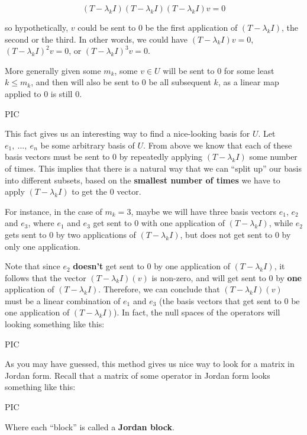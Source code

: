 \documentclass[10pt, oneside]{article}
\begin{document}
   $$(T - \lambda_k I) (T - \lambda_k I) (T - \lambda_k I) v = 0$$

   so hypothetically, $v$ could be sent to $0$ be the first application of $(T - \lambda_k I)$, the second or the third. In other words,
   we could have $(T - \lambda_k I) v = 0$, $(T - \lambda_k I)^2 v = 0$, or $(T - \lambda_k I)^3 v = 0$.
   \newline

   More generally given some $m_k$, some
   $v \in U$ will be sent to $0$ for some least $k \leq m_k$, and then will also be sent to $0$ be all subsequent $k$, as a linear map applied to $0$ is still $0$.
   \newline

   PIC
   \newline

   This fact gives us an interesting way to find a nice-looking basis for $U$. Let $e_1, \ ..., \ e_n$ be some arbitrary basis of $U$. From above we know that each of
   these basis vectors must be sent to $0$ by repeatedly applying $(T - \lambda_k I)$ some number of times. This implies that there is a natural way that we can
   ``split up'' our basis into different subsets, based
   on the \textbf{smallest number of times} we have to apply $(T - \lambda_k I)$ to get the $0$ vector.
   \newline

   For instance, in the case of $m_k = 3$, maybe we will have three basis vectors $e_1$, $e_2$ and $e_3$, where $e_1$ and $e_3$ get sent to $0$ with one application of $(T - \lambda_k I)$, while
   $e_2$ gets sent to $0$ by two applications of $(T - \lambda_k I)$, but does not get sent to $0$ by only one application.
   \newline

   Note that since $e_2$ \textbf{doesn't} get sent to $0$ by
   one application of $(T - \lambda_k I)$, it follows that the vector $(T - \lambda_k I)(v)$ is non-zero, and will get sent to $0$ by \textbf{one} application of $(T - \lambda_k I)$. Therefore,
   we can conclude that $(T - \lambda_k I)(v)$ must be a linear combination of $e_1$ and $e_3$ (the basis vectors that get sent to $0$ be one application of $(T - \lambda_k I)$). In fact, the
   null spaces of the operators will looking something like this:
   \newline

   PIC
   \newline

   As you may have guessed, this method gives us nice way to look for a matrix in Jordan form. Recall that a matrix of some operator in Jordan form looks something like this:
   \newline

   PIC
   \newline

   Where each ``block'' is called a \textbf{Jordan block}. 

    
\end{document}
